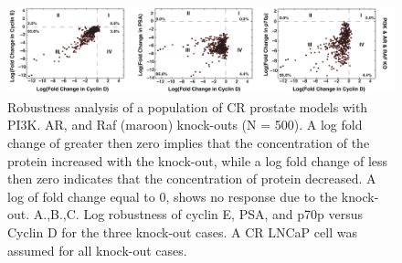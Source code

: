 \documentclass[12pt]{article}
\begin{document}
\clearpage

\begin{figure}\centering
\includegraphics[width=1.0\textwidth]{./figs/Supp_Figure_TripleKOCase.pdf}
\caption{Robustness analysis of a population of CR prostate models with PI3K. AR, and Raf (maroon) knock-outs (N = 500). A log fold change of greater then zero implies that the concentration of the protein increased with the knock-out, while a log fold change of less then zero indicates that the concentration of protein decreased. A log of fold change equal to 0, shows no response due to the knock-out. A.,B.,C. Log robustness of cyclin E, PSA, and p70p versus Cyclin D for the three knock-out cases. A CR LNCaP cell was assumed for all knock-out cases.}
\label{fg:Triple_KO}
\end{figure}

\clearpage

\end{document}
